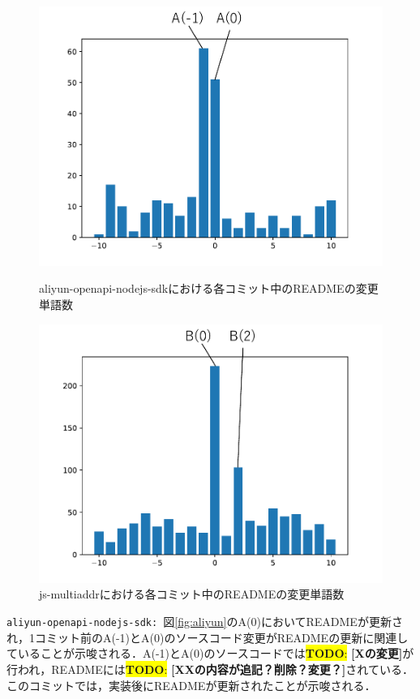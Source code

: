 \documentclass[uplatex,dvipdfmx,a4paper,twocolumn,base=11pt,jbase=11pt,ja=standard]{bxjsarticle}  %
\newcommand{\todo}[1]{\colorbox{yellow}{{\bf TODO}:}{\color{red} {\textbf{[#1]}}}}
\begin{document}
\begin{figure}[t]
\begin{center}
\includegraphics[width=0.7\linewidth]{use_aliyun.pdf}
\vspace{-5mm}
\caption{aliyun-openapi-nodejs-sdkにおける各コミット中のREADMEの変更単語数}
\label{fig:aliyun}
\end{center}

\vspace{-8mm}

\begin{center}
\includegraphics[width=0.7\linewidth]{use_js.pdf}
\vspace{-5mm}
\caption{js-multiaddrにおける各コミット中のREADMEの変更単語数}
\label{fig:multiaddr}
\end{center}
\vspace{-12mm}
\end{figure}

\noindent\texttt{aliyun-openapi-nodejs-sdk: }図\ref{fig:aliyun}のA(0)においてREADMEが更新され，1コミット前のA(-1)とA(0)のソースコード変更がREADMEの更新に関連していることが示唆される．A(-1)とA(0)のソースコードでは\todo{Xの変更}が行われ，READMEには\todo{XXの内容が追記？削除？変更？}されている．このコミットでは，実装後にREADMEが更新されたことが示唆される．
\end{document}
